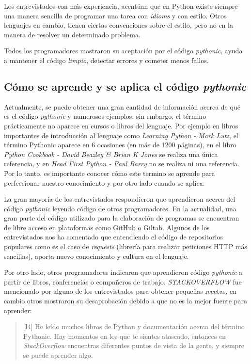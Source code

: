 \documentclass[a4paper, 12pt]{book}
\begin{document}
Los entrevistados con más experiencia, acentúan que en Python existe siempre una manera sencilla de programar una tarea con \textit{idioms} y con estilo. Otros lenguajes en cambio, tienen ciertas convenciones sobre el estilo, pero no en la manera de resolver un determinado problema.

Todos los programadores mostraron su aceptación por el código \textit{pythonic}, ayuda a mantener el código \textit{limpio}, detectar errores y cometer menos fallos.


\subsection{Cómo se aprende y se aplica el código \textit{pythonic}}

Actualmente, se puede obtener una gran cantidad de información acerca de qué es el código \textit{pythonic} y numerosos ejemplos, sin embargo, el término prácticamente no aparece en cursos o libros del lenguaje. Por ejemplo en libros importantes de introducción al lenguaje como \textit{Learning Python - Mark Lutz}, el término Pythonic aparece en 6 ocasiones (en más de 1200 páginas), en el libro \textit{Python Cookbook - David Beazley \& Brian K Jones} se realiza una única referencia, y en \textit{Head First Python - Paul Barry} no se realiza ni una referencia. Por lo tanto, es importante conocer cómo este termino se aprende para perfeccionar nuestro conocimiento y por otro lado cuando se aplica.

La gran mayoría de los entrevistados respondieron que aprendieron acerca del código \textit{pythonic} leyendo código de otros programadores. En la actualidad, una gran parte del código utilizado para la elaboración de programas se encuentran de libre acceso en plataformas como GitHub o Giltab. Algunos de los entrevistados nos ha comentado que entendiendo el código de repositorios populares como es el caso de \textit{requests} (librería para realizar peticiones HTTP más sencillas), aporta nuevo conocimiento y cultura en el lenguaje.

Por otro lado, otros programadores indicaron que aprendieron código \textit{pythonic} a partir de libros, conferencias o compañeros de trabajo. \textit{STACKOVERFLOW} fue mencionado por alguno de los entrevistados para obtener pequeñas recetas, en cambio otros mostraron su desaprobación debido a que no es la mejor fuente para aprender:

\begin{quote}
\small
    [I4] He leído muchos libros de Python y documentación acerca del término Pythonic. Hay momentos en los que te sientes atascado, entonces en \textit{StackOverflow} encuentras diferentes puntos de vista de la gente, y siempre se puede aprender algo.
\end{quote}
\end{document}
